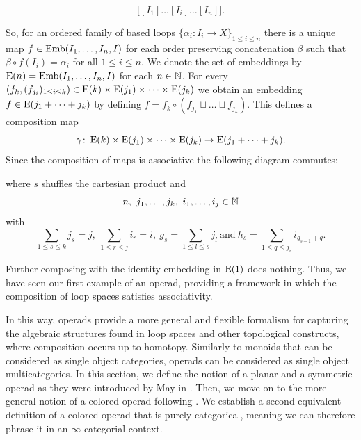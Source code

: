     \[
        \big[[I_1] \dots [I_i] \dots [I_n]\big].
    \]
    
    So, for an ordered family of based loops $\{\alpha_i \colon I_i \to X\}_{1 \leq i
    \leq n}$ there is a unique map $f \in \operatorname{Emb}(I_1, \dots, I_n, I)$ for each
    order preserving concatenation $\beta$ such that $\beta \circ f (I_i) =
    \alpha_i$ for all $1 \leq i \leq n$. We denote the set of embeddings by
    $\operatorname{E}(n) = \operatorname{Emb}(I_1, \dots, I_n, I)$ for each $n \in \mathbb{N}$. For every $(f_k,
    (f_{j_i})_{1 \leq i \leq k}) \in  \operatorname{E}(k) \times \operatorname{E}(j_1) \times \dots \times
    \operatorname{E}(j_k)$ we obtain an embedding $f \in \operatorname{E}(j_1 + \dots + j_k)$ by defining $f
    = f_k \circ (f_{j_1} \sqcup \dots \sqcup f_{j_k})$. This defines a
    composition map 
    \[
        \gamma \colon \operatorname{E}(k) \times \operatorname{E}(j_1) \times \dots \times \operatorname{E}(j_k) \to \operatorname{E}(j_1 + \dots + j_k).
    \]
    Since the composition of maps is associative the following diagram commutes:
    \begin{center}
    \end{center}
    where $s$ shuffles the cartesian product and
    \[
                n,  \ j_1, \dots, j_k, \ i_1, \dots, i_j \in \N
            \]
            with
            \[
                \sum_{1 \leq s \leq k} j_s = j, ~ \sum_{1 \leq r \leq j} i_r = i, \ g_s = \sum_{1 \leq l \leq s} j_l \ \text{and} \ h_s = \sum_{1 \leq q \leq j_s} i_{g_{s-1}+q}.
            \]
    
    Further composing with the identity embedding in $\operatorname{E}(1)$ does nothing. Thus,
    we have seen our first example of an operad, providing a framework in which
    the composition of loop spaces satisfies associativity.

    In this way, operads provide a more general and flexible formalism for
    capturing the algebraic structures found in loop spaces and other
    topological constructs, where composition occurs up to homotopy. Similarly
    to monoids that can be considered as single object categories, operads can
    be considered as single object multicategories. In this section, we define
    the notion of a planar and a symmetric operad as they were introduced by May
    in \cite{may}. Then, we move on to the more general notion of a colored
    operad following \cite{ha}. We establish a second equivalent definition
    of a colored operad that is purely categorical, meaning we can therefore
    phrase it in an $\infty$-categorial context.
    
